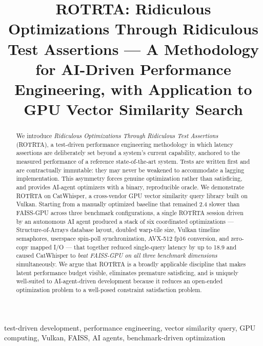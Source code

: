 \documentclass[conference]{IEEEtran}
\begin{document}
\title{ROTRTA: Ridiculous Optimizations Through Ridiculous Test Assertions ---
       A Methodology for AI-Driven Performance Engineering, with Application
       to GPU Vector Similarity Search}

\author{
}

\maketitle

\begin{abstract}
We introduce \emph{Ridiculous Optimizations Through Ridiculous Test Assertions}
(ROTRTA), a test-driven performance engineering methodology in which
latency assertions are deliberately set beyond a system's current capability,
anchored to the measured performance of a reference state-of-the-art system.
Tests are written first and are contractually immutable: they may never be
weakened to accommodate a lagging implementation.  This asymmetry forces
genuine optimization rather than satisficing, and provides AI-agent optimizers
with a binary, reproducible oracle.  We demonstrate ROTRTA on CatWhisper, a
cross-vendor GPU vector similarity query library built on Vulkan.  Starting
from a manually optimized baseline that remained \SI{2.4}{\times} slower than
FAISS-GPU across three benchmark configurations, a single ROTRTA session
driven by an autonomous AI agent produced a stack of six coordinated
optimizations --- Structure-of-Arrays database layout, doubled warp-tile size,
Vulkan timeline semaphores, userspace spin-poll synchronization, AVX-512
fp16 conversion, and zero-copy mapped I/O --- that together reduced
single-query latency by up to \SI{18.9}{\times} and caused CatWhisper to
\emph{beat FAISS-GPU on all three benchmark dimensions} simultaneously.
We argue that ROTRTA is a broadly applicable discipline that makes latent
performance budget visible, eliminates premature satisficing, and is
uniquely well-suited to AI-agent-driven development because it reduces an
open-ended optimization problem to a well-posed constraint satisfaction
problem.
\end{abstract}

\begin{IEEEkeywords}
test-driven development, performance engineering, vector similarity query,
GPU computing, Vulkan, FAISS, AI agents, benchmark-driven optimization
\end{IEEEkeywords}
\end{document}
